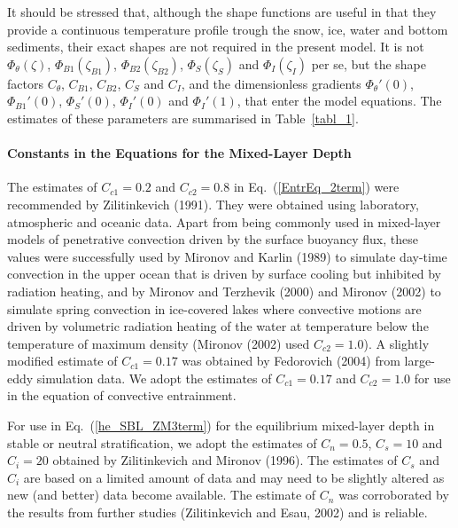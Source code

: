 %

It should be stressed that, although 
the shape functions are useful in that 
they provide a continuous temperature profile
trough the snow, ice, water and bottom sediments,
their exact shapes are not required in the present model. 
It is not $\Phi_{\theta}(\zeta)$, $\Phi_{B1}(\zeta_{B1})$, $\Phi_{B2}(\zeta_{B2})$, 
$\Phi_S(\zeta_{S})$ and $\Phi_I(\zeta_{I})$ per se, 
but the shape factors $C_{\theta}$, $C_{B1}$, $C_{B2}$, $C_{S}$ and $C_{I}$,
and the dimensionless gradients 
$\Phi_{\theta}'(0)$, $\Phi_{B1}'(0)$, $\Phi_S'(0)$, $\Phi_I'(0)$ and $\Phi_I'(1)$, 
that enter the model equations. 
The estimates of these parameters are summarised in Table~\ref{tabl_1}.


\paragraph{Constants in the Equations for the Mixed-Layer Depth}\label{empir_const_h}
\nopagebreak 
The estimates of $C_{c1}=0.2$ and $C_{c2}=0.8$ 
in Eq.~(\ref{EntrEq_2term})
were recommended by Zilitinkevich (1991). 
They were obtained using laboratory, atmospheric and oceanic data.
Apart from being commonly used in mixed-layer models of penetrative convection
driven by the surface buoyancy flux, these values
were successfully used by Mironov and Karlin (1989) to simulate
day-time convection in the upper ocean that is driven by surface cooling
but inhibited by radiation heating,
and by Mironov and Terzhevik (2000) and Mironov \etal (2002)
to simulate spring convection in ice-covered lakes  
where convective motions are driven by volumetric radiation heating of
the water at temperature below the temperature of maximum density 
(Mironov \etal (2002) used $C_{c2}=1.0$).
A slightly modified estimate of $C_{c1}=0.17$ was obtained by Fedorovich \etal (2004)\nocite{fedoro2004} 
from large-eddy simulation data.
We adopt the estimates of $C_{c1}=0.17$ and $C_{c2}=1.0$
for use in the equation of convective entrainment. 

For use in Eq.~(\ref{he_SBL_ZM3term}) for the equilibrium mixed-layer depth 
in stable or neutral stratification, we adopt the estimates of 
$C_n=0.5$, $C_s=10$ and $C_i=20$ obtained by Zilitinkevich and Mironov (1996). 
The estimates of $C_s$ and $C_i$ are based on a limited amount of data 
and may need to be slightly altered as new (and better) data become available. 
The estimate of $C_n$ was corroborated by the results from further studies 
(Zilitinkevich and Esau, 2002) and is reliable. 

